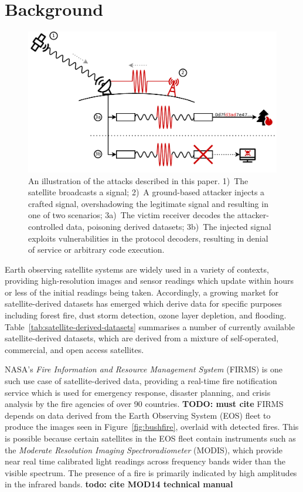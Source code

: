 \section{Background}\label{sec:background}
\begin{figure}
    \centering
    \includegraphics[width=\columnwidth]{diagrams/attack_illustration.pdf}
    \caption{An illustration of the attacks described in this paper. 1)~The satellite broadcasts a signal; 2)~A ground-based attacker injects a crafted signal, overshadowing the legitimate signal and resulting in one of two scenarios; 3a)~The victim receiver decodes the attacker-controlled data, poisoning derived datasets; 3b)~The injected signal exploits vulnerabilities in the protocol decoders, resulting in denial of service or arbitrary code execution.}
    \label{fig:attack-illustration}
\end{figure}

Earth observing satellite systems are widely used in a variety of contexts, providing high-resolution images and sensor readings which update within hours or less of the initial readings being taken.
Accordingly, a growing market for satellite-derived datasets has emerged which derive data for specific purposes including forest fire, dust storm detection, ozone layer depletion, and flooding.
Table~\ref{tab:satellite-derived-datasets} summarises a number of currently available satellite-derived datasets, which are derived from a mixture of self-operated, commercial, and open access satellites.

NASA's \textit{Fire Information and Resource Management System} (FIRMS) is one such use case of satellite-derived data, providing a real-time fire notification service which is used for emergency response, disaster planning, and crisis analysis by the fire agencies of over 90 countries. \textbf{TODO: must cite}
FIRMS depends on data derived from the Earth Observing System (EOS) fleet to produce the images seen in Figure~\ref{fig:bushfire}, overlaid with detected fires.
This is possible because certain satellites in the EOS fleet contain instruments such as the \textit{Moderate Resolution Imaging Spectroradiometer} (MODIS), which provide near real time calibrated light readings across frequency bands wider than the visible spectrum.
The presence of a fire is primarily indicated by high amplitudes in the infrared bands. \textbf{todo: cite MOD14 technical manual}

